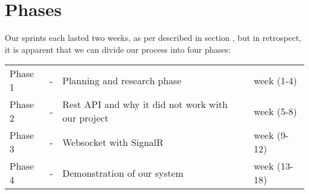 \chapter{Phases}
Our sprints each lasted two weeks, as per described in section , but in retrospect, it is apparent that we can divide our process into four phases:

\begin{center}
	\begin{tabular}{lcll}
		Phase 1 & - & Planning and research phase & week (1-4) \\
		Phase 2& - & Rest API and why it did not work with our project& week (5-8) \\
		Phase 3 & - & Websocket with SignalR & week (9-12) \\
		Phase 4 & - & Demonstration of our system & week (13-18) 
	\end{tabular}
\end{center}


%
%
%




% 

